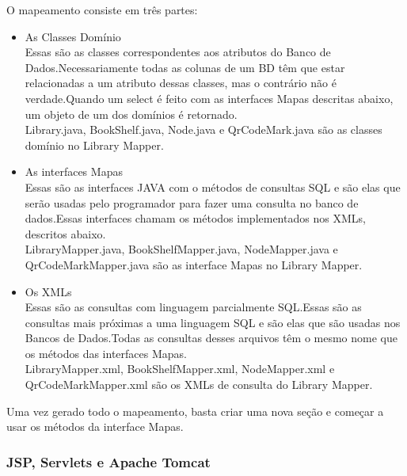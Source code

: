 \documentclass[a4paper,10pt]{article}
\begin{document}
	O mapeamento consiste em três partes:\\
	\begin{itemize}
	\item{As Classes Domínio}\\
	Essas são as classes correspondentes aos atributos do Banco de Dados.Necessariamente todas as colunas de um BD têm 
	que estar relacionadas a um atributo dessas classes, mas o contrário não é verdade.Quando um select é feito com as interfaces Mapas
	descritas abaixo, um objeto de um dos domínios é retornado.\\

	Library.java, BookShelf.java, Node.java e QrCodeMark.java são as classes domínio no Library Mapper.\\

	\item{As interfaces Mapas}\\
	Essas são as interfaces JAVA com o métodos de consultas SQL e são elas que serão usadas pelo programador para fazer uma consulta
	no banco de dados.Essas interfaces chamam os métodos implementados nos XMLs, descritos abaixo.\\
		
	LibraryMapper.java, BookShelfMapper.java, NodeMapper.java e QrCodeMarkMapper.java são as interface Mapas no Library Mapper.\\
	\item{Os XMLs}\\
	Essas são as consultas com linguagem parcialmente SQL.Essas são as consultas mais próximas a uma linguagem SQL e são elas que são
	usadas nos Bancos de Dados.Todas as consultas desses arquivos têm o mesmo nome que os métodos das interfaces Mapas.\\

	LibraryMapper.xml, BookShelfMapper.xml, NodeMapper.xml e QrCodeMarkMapper.xml são os XMLs de consulta do Library Mapper.\\
	\end{itemize}
	
	Uma vez gerado todo o mapeamento, basta criar uma nova seção e começar a usar os métodos da interface Mapas.
	

	\subsubsection{JSP, Servlets e Apache Tomcat}
\end{document}

